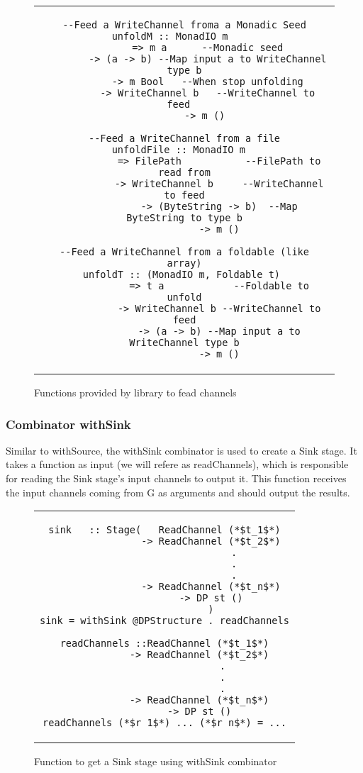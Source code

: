 \begin{figure}[H]
    \begin{tabular}{c}
        \begin{lstlisting}
--Feed a WriteChannel froma a Monadic Seed
unfoldM :: MonadIO m	 
        => m a	    --Monadic seed
        -> (a -> b) --Map input a to WriteChannel type b
        -> m Bool	--When stop unfolding
        -> WriteChannel b   --WriteChannel to feed	
        -> m () 

--Feed a WriteChannel from a file
unfoldFile :: MonadIO m	 
            => FilePath	          --FilePath to read from
            -> WriteChannel b     --WriteChannel to feed
            -> (ByteString -> b)  --Map ByteString to type b
            -> m ()

--Feed a WriteChannel from a foldable (like array)
unfoldT :: (MonadIO m, Foldable t) 
            => t a            --Foldable to unfold
            -> WriteChannel b --WriteChannel to feed
            -> (a -> b) --Map input a to WriteChannel type b
            -> m ()
        \end{lstlisting}
    \end{tabular}
    \caption[{[Code]}Fead channels]{Functions provided by library to fead channels}
    \label{fig:HC4}
\end{figure}

\subsubsection*{Combinator withSink}
Similar to withSource, the withSink combinator is used to create a Sink stage.
It takes a function as input (we will refere as readChannels), which is responsible for reading the Sink stage's input channels to output it.
This function receives the input channels coming from G as arguments and should output the results.

\begin{figure}[H]
    \begin{tabular}{c}
        \begin{lstlisting}
sink   :: Stage(   ReadChannel (*$t_1$*)
                -> ReadChannel (*$t_2$*)
                        .
                        .
                        .
                -> ReadChannel (*$t_n$*)
                -> DP st ()
                )
sink = withSink @DPStructure . readChannels

readChannels ::ReadChannel (*$t_1$*)
            -> ReadChannel (*$t_2$*)
                    .
                    .
                    .
            -> ReadChannel (*$t_n$*)
            -> DP st ()
readChannels (*$r_1$*) ... (*$r_n$*) = ...
        \end{lstlisting}
    \end{tabular}
    \caption[{[Code]}withSink]{Function to get a Sink stage using withSink combinator}
    \label{fig:HC5}
\end{figure}

